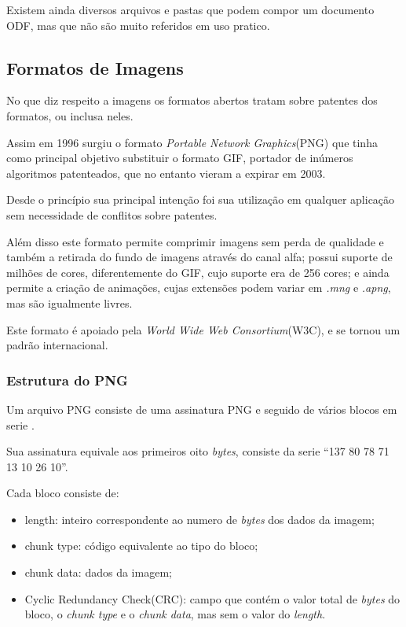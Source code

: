 Existem ainda diversos arquivos e pastas que podem compor um documento ODF, mas que não são muito referidos em uso pratico.


\subsection{Formatos de Imagens}

No que diz respeito a imagens os formatos abertos tratam sobre patentes dos formatos, ou inclusa neles.

Assim em 1996 surgiu o formato \textit{Portable Network Graphics}(PNG) que tinha como principal objetivo substituir o formato GIF, portador de inúmeros algoritmos patenteados, que no entanto vieram a expirar em 2003.

Desde o princípio sua principal intenção foi sua utilização em qualquer aplicação sem necessidade de conflitos sobre patentes.

Além disso este formato permite comprimir imagens sem perda de qualidade e também a retirada do fundo de imagens através do canal alfa; possui suporte de milhões de cores, diferentemente do GIF, cujo suporte era de 256 cores; e ainda permite a criação de animações, cujas extensões podem variar em \textit{.mng} e \textit{.apng}, mas são igualmente livres.

Este formato é apoiado pela \textit{World Wide Web Consortium}(W3C), e se tornou um padrão internacional.

\subsubsection{Estrutura do PNG}

Um arquivo PNG consiste de uma assinatura PNG e seguido de vários blocos em serie \cite{PNG-BOOK}.

Sua assinatura equivale aos primeiros oito \textit{bytes}, consiste da serie “137 80 78 71 13 10 26 10”.

Cada bloco consiste de:

\begin{itemize}
    \item{length: inteiro correspondente ao numero de \textit{bytes} dos dados da imagem;}
    \item{chunk type: código equivalente ao tipo do bloco;}
    \item{chunk data: dados da imagem;}
    \item{Cyclic Redundancy Check(CRC): campo que contém o valor total de \textit{bytes} do bloco, o \textit{chunk type} e o \textit{chunk data}, mas sem o valor do \textit{length}.}
\end{itemize}

